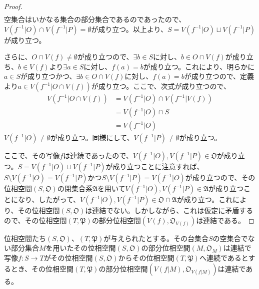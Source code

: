 \documentclass[dvipdfmx]{jsarticle}
\begin{document}
\begin{proof}
\begin{align*}
\end{align*}
空集合はいかなる集合の部分集合であるのであったので、$V\left( f^{- 1}|O \right) \cap V\left( f^{- 1}|P \right) = \emptyset$が成り立つ。以上より、$S = V\left( f^{- 1}|O \right) \sqcup V\left( f^{- 1}|P \right)$が成り立つ。\par
さらに、$O \cap V(f) \neq \emptyset$が成り立つので、$\exists b \in S$に対し、$b \in O \cap V(f)$が成り立ち、$b \in V(f)$より$\exists a \in S$に対し、$f(a) = b$が成り立つ。これにより、明らかに$a \in S$が成り立つかつ、$\exists b \in O \cap V(f)$に対し、$f(a) = b$が成り立つので、定義より$a \in V\left( f^{- 1}|O \cap V(f) \right)$が成り立つ。ここで、次式が成り立つので、
\begin{align*}
V\left( f^{- 1}|O \cap V(f) \right) &= V\left( f^{- 1}|O \right) \cap V\left( f^{- 1}|V(f) \right)\\
&= V\left( f^{- 1}|O \right) \cap S\\
&= V\left( f^{- 1}|O \right)
\end{align*}
$V\left( f^{- 1}|O \right) \neq \emptyset$が成り立つ。同様にして、$V\left( f^{- 1}|P \right) \neq \emptyset$が成り立つ。\par
ここで、その写像$f$は連続であったので、$V\left( f^{- 1}|O \right),V\left( f^{- 1}|P \right) \in \mathfrak{O}$が成り立つ。$S = V\left( f^{- 1}|O \right) \sqcup V\left( f^{- 1}|P \right)$が成り立つことに注意すれば、$S \setminus V\left( f^{- 1}|O \right) = V\left( f^{- 1}|P \right)$かつ$S \setminus V\left( f^{- 1}|P \right) = V\left( f^{- 1}|O \right)$が成り立つので、その位相空間$\left( S,\mathfrak{O} \right)$の閉集合系$\mathfrak{A}$を用いて$V\left( f^{- 1}|O \right),V\left( f^{- 1}|P \right) \in \mathfrak{A}$が成り立つことになり、したがって、$V\left( f^{- 1}|O \right),V\left( f^{- 1}|P \right) \in \mathfrak{O} \cap \mathfrak{A}$が成り立つ。これにより、その位相空間$\left( S,\mathfrak{O} \right)$は連結でない。しかしながら、これは仮定に矛盾するので、その位相空間$\left( T,\mathfrak{P} \right)$の部分位相空間$\left( V(f),\mathfrak{O}_{V(f)} \right)$は連結である。
\end{proof}
\begin{thm}\label{8.1.5.4}
位相空間たち$\left( S,\mathfrak{O} \right)$、$\left( T,\mathfrak{P} \right)$が与えられたとする。その台集合$S$の空集合でない部分集合$M$を用いたその位相空間$\left( S,\mathfrak{O} \right)$の部分位相空間$\left( M,\mathfrak{O}_{M} \right)$は連結で写像$f:S \rightarrow T$がその位相空間$\left( S,\mathfrak{O} \right)$からその位相空間$\left( T,\mathfrak{P} \right)$へ連続であるとするとき、その位相空間$\left( T,\mathfrak{P} \right)$の部分位相空間$\left( V\left( f|M \right),\mathfrak{O}_{V\left( f|M \right)} \right)$は連結である。
\end{thm}
\end{document}
